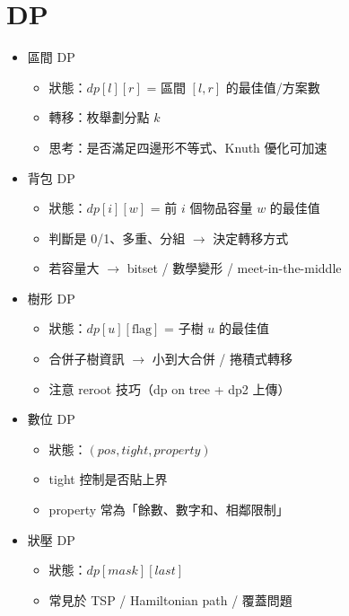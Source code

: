 \documentclass[a4paper,10pt,twocolumn,oneside]{article}
\begin{document}
\section{DP}

\begin{itemize}[nolistsep]
    \item 區間 DP  
        \begin{itemize}[nolistsep]
            \item 狀態：$dp[l][r]$ = 區間 $[l,r]$ 的最佳值/方案數  
            \item 轉移：枚舉劃分點 $k$  
            \item 思考：是否滿足四邊形不等式、Knuth 優化可加速  
        \end{itemize}
    \item 背包 DP  
        \begin{itemize}[nolistsep]
            \item 狀態：$dp[i][w]$ = 前 $i$ 個物品容量 $w$ 的最佳值  
            \item 判斷是 0/1、多重、分組 $\rightarrow$ 決定轉移方式  
            \item 若容量大 $\rightarrow$ bitset / 數學變形 / meet-in-the-middle  
        \end{itemize}
    \item 樹形 DP  
        \begin{itemize}[nolistsep]
            \item 狀態：$dp[u][\text{flag}]$ = 子樹 $u$ 的最佳值  
            \item 合併子樹資訊 $\rightarrow$ 小到大合併 / 捲積式轉移  
            \item 注意 reroot 技巧（dp on tree + dp2 上傳）  
        \end{itemize}
    \item 數位 DP  
        \begin{itemize}[nolistsep]
            \item 狀態：$(pos, tight, property)$  
            \item tight 控制是否貼上界  
            \item property 常為「餘數、數字和、相鄰限制」  
        \end{itemize}
    \item 狀壓 DP  
        \begin{itemize}[nolistsep]
            \item 狀態：$dp[mask][last]$  
            \item 常見於 TSP / Hamiltonian path / 覆蓋問題  

\end{itemize}
\end{itemize}
\end{document}
